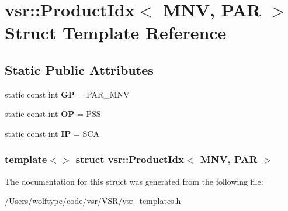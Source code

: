 \hypertarget{structvsr_1_1_product_idx_3_01_m_n_v_00_01_p_a_r_01_4}{\section{vsr\-:\-:Product\-Idx$<$ M\-N\-V, P\-A\-R $>$ Struct Template Reference}
\label{structvsr_1_1_product_idx_3_01_m_n_v_00_01_p_a_r_01_4}
}
\subsection*{Static Public Attributes}
\begin{DoxyCompactItemize}
\item 
\hypertarget{structvsr_1_1_product_idx_3_01_m_n_v_00_01_p_a_r_01_4_aa50972a632bbb9b875e765f4b11bb529}{static const int {\bfseries G\-P} = P\-A\-R\-\_\-\-M\-N\-V}\label{structvsr_1_1_product_idx_3_01_m_n_v_00_01_p_a_r_01_4_aa50972a632bbb9b875e765f4b11bb529}

\item 
\hypertarget{structvsr_1_1_product_idx_3_01_m_n_v_00_01_p_a_r_01_4_ae5c18738830ba1a11940c7c5069e393c}{static const int {\bfseries O\-P} = P\-S\-S}\label{structvsr_1_1_product_idx_3_01_m_n_v_00_01_p_a_r_01_4_ae5c18738830ba1a11940c7c5069e393c}

\item 
\hypertarget{structvsr_1_1_product_idx_3_01_m_n_v_00_01_p_a_r_01_4_ab417b17cf39d2bd3b49eaf62dc00ed97}{static const int {\bfseries I\-P} = S\-C\-A}\label{structvsr_1_1_product_idx_3_01_m_n_v_00_01_p_a_r_01_4_ab417b17cf39d2bd3b49eaf62dc00ed97}

\end{DoxyCompactItemize}
\subsubsection*{template$<$$>$ struct vsr\-::\-Product\-Idx$<$ M\-N\-V, P\-A\-R $>$}



The documentation for this struct was generated from the following file\-:\begin{DoxyCompactItemize}
\item 
/\-Users/wolftype/code/vsr/\-V\-S\-R/vsr\-\_\-templates.\-h\end{DoxyCompactItemize}
